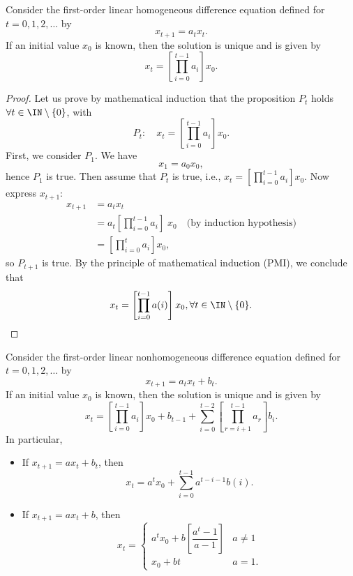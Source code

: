 \begin{proposition}
Consider the first-order linear homogeneous difference equation defined for $t=0,1,2,\dots$ by
\[
x_{t+1}=a_tx_t.
\]
If an initial value $x_0$ is known, then the solution is unique and is given by
\[
x_t=\left [\prod_{i=0}^{t-1} a_i\right ]x_0.
\]
\end{proposition}

\begin{proof}
Let us prove by mathematical induction that the proposition $P_t$ holds $\forall t\in \IN\setminus\{0\}$, with
\[
P_t: \quad x_t=\left [\prod_{i=0}^{t-1} a_i\right ]x_0.
\]
First, we consider $P_1$. We have
$$x_1=a_0x_0,$$
hence $P_1$ is true. Then assume that $P_t$ is true, i.e., $x_t=\left [\prod_{i=0}^{t-1} a_i\right ]x_0$. Now express $x_{t+1}$:
\begin{align*}
x_{t+1} &= a_tx_t \\
&=a_t\left [\prod_{i=0}^{t-1} a_i\right ]\;x_0 \quad\textrm{(by induction hypothesis)}\\
&= \left [\prod_{i=0}^t a_i\right ]x_0,
\end{align*}
so $P_{t+1}$ is true.
By the principle of mathematical induction (PMI), we conclude that 
\[
x_t=\left [\prod_{i=0}^{t-1} a(i)\right ]x_0, \forall t\in \IN\setminus\{0\}.\qedhere
\]
\end{proof}


\begin{proposition}\label{Prop:FirstLinNonH}
Consider the first-order linear nonhomogeneous difference equation defined for $t=0,1,2,\dots$ by
$$x_{t+1}=a_tx_t + b_t.$$
If an initial value $x_0$ is known, then the solution is unique and is given by
\[
x_t=\left [\prod_{i=0}^{t-1} a_i\right ]x_0 +b_{t-1}+\sum_{i=0}^{t-2}\left [ \prod_{r=i+1}^{t-1} a_r \right]b_i.
\]
In particular,
\begin{itemize}
\item If $x_{t+1}=a x_t + b_t$, then 
$$x_t=a ^t x_0 +\sum_{i=0}^{t-1} a^{t-i-1}b(i).$$
\item If $x_{t+1}=a x_t + b$, then 
$$x_t=
\begin{cases}
a ^t x_0 +b\left[\dfrac{a^t-1}{a-1}\right] & a\not =1\\  
x_0 +bt & a =1.
\end{cases}
$$
\end{itemize}
\end{proposition}


